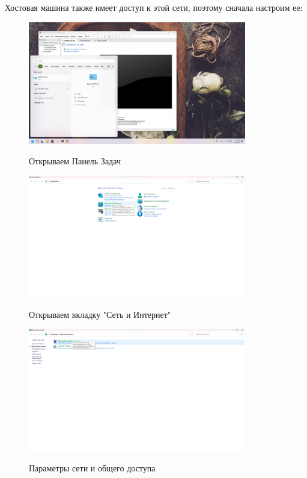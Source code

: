 \documentclass[a4paper]{article}
\begin{document}
  Хостовая машина также имеет доступ к этой сети, поэтому сначала настроим ее:

  \begin{figure}[H]
    \centering
    \includegraphics[width=0.85\textwidth]{06_00 (43)}
    \label{img:43}
    \caption{Открываем Панель Задач}
  \end{figure}
  
  \begin{figure}[H]
    \centering
    \includegraphics[width=0.85\textwidth]{06_00 (44)}
    \label{img:44}
    \caption{Открываем вкладку "Сеть и Интернет"}
  \end{figure}
  
  \begin{figure}[H]
    \centering
    \includegraphics[width=0.85\textwidth]{06_00 (45)}
    \label{img:45}
    \caption{Параметры сети и общего доступа}
  \end{figure}
  
\end{document}
